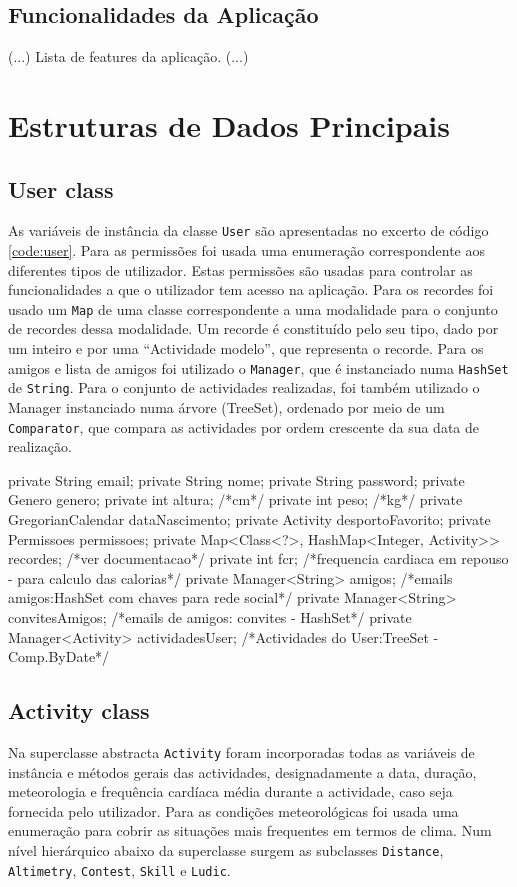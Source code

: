 \documentclass[a4paper,10pt]{report}
\begin{document}
\section{Funcionalidades da Aplicação}
\label{sec:funcionalidades}
(...)
Lista de features da aplicação.
(...)

\chapter{Estruturas de Dados Principais}
\label{cap:estruturas}
\section{User class}
\label{sec:user}
As variáveis de instância da classe \verb!User! são apresentadas no excerto de código \ref{code:user}.
Para as permissões foi usada uma enumeração correspondente aos diferentes tipos de utilizador. 
Estas permissões são usadas para controlar as funcionalidades a que o utilizador tem acesso na aplicação.
Para os recordes foi usado um \verb!Map! de uma classe correspondente a uma modalidade para o conjunto de recordes dessa modalidade. 
Um recorde é constituído pelo seu tipo, dado por um inteiro e por uma ``Actividade modelo'', que representa o recorde.
Para os amigos e lista de amigos foi utilizado o \verb!Manager!, que é instanciado numa \verb!HashSet! de \verb!String!.
Para o conjunto de actividades realizadas, foi também utilizado o Manager instanciado numa árvore (TreeSet), ordenado por meio 
de um \verb!Comparator!, que compara as actividades por ordem crescente da sua data de realização.

\begin{code}[caption=Variáveis de instância da classe User (src/model/user)., label=code:user]
private String email;
private String nome;
private String password;
private Genero genero;
private int altura; /*cm*/
private int peso; /*kg*/
private GregorianCalendar dataNascimento;
private Activity desportoFavorito;
private Permissoes permissoes;
private Map<Class<?>, HashMap<Integer, Activity>>  recordes; /*ver documentacao*/
private int fcr; /*frequencia cardiaca em repouso - para calculo das calorias*/
private Manager<String> amigos; /*emails amigos:HashSet com chaves para rede social*/
private Manager<String> convitesAmigos; /*emails de amigos: convites - HashSet*/
private Manager<Activity> actividadesUser; /*Actividades do User:TreeSet -Comp.ByDate*/
\end{code}

\section{Activity class}
\label{sec:activity}
Na superclasse abstracta \verb!Activity! foram incorporadas todas as variáveis de instância e métodos gerais das actividades, 
designadamente a data, duração, meteorologia e frequência cardíaca média durante a actividade, caso seja fornecida pelo utilizador.
Para as condições meteorológicas foi usada uma enumeração para cobrir as situações mais frequentes em termos de clima.
Num nível hierárquico abaixo da superclasse surgem as subclasses \verb!Distance!, \verb!Altimetry!, \verb!Contest!, \verb!Skill! e \verb!Ludic!.
\end{document}

